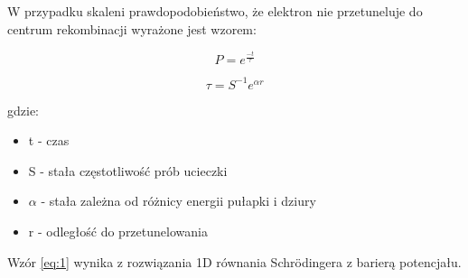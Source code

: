 W przypadku skaleni prawdopodobieństwo, że elektron nie przetuneluje do centrum rekombinacji wyrażone jest wzorem:

\begin{equation}
\label{eq:1}
P = e^{\frac{-t}{\tau}}
\end{equation}

\begin{equation}
\tau = S^{-1}e^{\alpha r}
\end{equation}


gdzie:
\begin{itemize}
\item t - czas
\item S - stała częstotliwość prób ucieczki
\item $\alpha$ -  stała zależna od różnicy energii pułapki i dziury
\item r - odległość do przetunelowania
\end{itemize}

Wzór \ref{eq:1} wynika z rozwiązania 1D równania Schrödingera z barierą potencjału.





